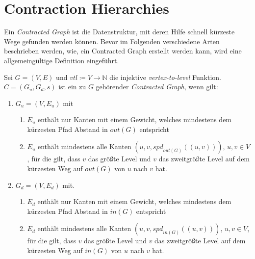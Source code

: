 \chapter{Contraction Hierarchies}\label{chapter:ch}


Ein \emph{Contracted Graph} ist die Datenstruktur, mit deren Hilfe schnell kürzeste Wege gefunden werden können.
Bevor im Folgenden verschiedene Arten beschrieben werden, wie, ein Contracted Graph erstellt werden kann, wird eine allgemeingültige Definition eingeführt.

\begin{definition}
    Sei $G = (V, E)$ und ${vtl} \coloneq V \to \mathbb{N}$ die injektive \emph{vertex-to-level} Funktion.
    ${C} = (G_u, G_d, s)$ ist ein zu $G$ gehörender \emph{Contracted Graph}, wenn gilt:
    \begin{enumerate}
        \item
              $G_u = (V, E_u)$ mit
              \begin{enumerate}
                  \item\label{ch:definition:legal_edges}
                  $E_u$ enthält nur Kanten mit einem Gewicht, welches mindestens dem kürzesten Pfad Abstand in ${out}(G)$ entspricht

                  \item\label{ch:definition:upward}
                  $E_u$ enthält mindestens alle Kanten $(u, v, {spd}_{{out}(G)}((u, v)))$, $u, v \in V$, für die gilt, dass $v$ das größte Level und $v$ das zweitgrößte Level auf dem kürzesten Weg auf ${out}(G)$ von $u$ nach $v$ hat.
              \end{enumerate}

        \item
              $G_d = (V, E_d)$ mit.
              \begin{enumerate}
                  \item
                        $E_d$ enthält nur Kanten mit einem Gewicht, welches mindestens dem kürzesten Pfad Abstand in ${in}(G)$ entspricht

                        \item\label{ch:definition:downward}
                        $E_d$ enthält mindestens alle Kanten $(u, v, {spd}_{{in}(G)}((u, v)))$, $u, v \in V$, für die gilt, dass $v$ das größte Level und $v$ das zweitgrößte Level auf dem kürzesten Weg auf ${in}(G)$ von $u$ nach $v$ hat.
              \end{enumerate}


\end{enumerate}
\end{definition}
